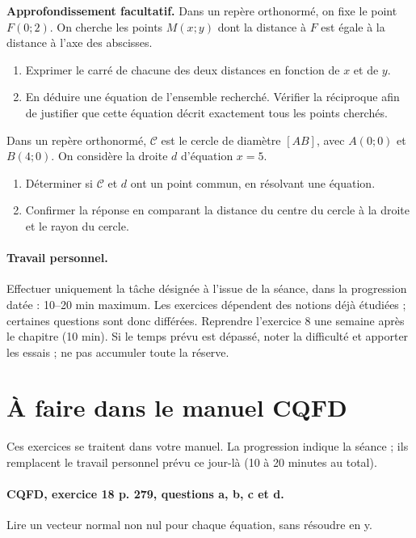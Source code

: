 \textbf{Approfondissement facultatif.} Dans un repère orthonormé, on fixe le point $F(0;2)$. On cherche les points $M(x;y)$ dont la distance à $F$ est égale à la distance à l’axe des abscisses.
\begin{enumerate}[label=\arabic*.]
\item Exprimer le carré de chacune des deux distances en fonction de $x$ et de $y$.
\item En déduire une équation de l’ensemble recherché. Vérifier la réciproque afin de justifier que cette équation décrit exactement tous les points cherchés.
\end{enumerate}
Dans un repère orthonormé, $\mathcal C$ est le cercle de diamètre $[AB]$, avec $A(0;0)$ et $B(4;0)$. On considère la droite $d$ d’équation $x=5$.
\begin{enumerate}[label=\arabic*.]
\item Déterminer si $\mathcal C$ et $d$ ont un point commun, en résolvant une équation.
\item Confirmer la réponse en comparant la distance du centre du cercle à la droite et le rayon du cercle.
\end{enumerate}
\paragraph{Travail personnel.} Effectuer uniquement la tâche désignée à l’issue de la séance, dans la progression datée : 10–20 min maximum. Les exercices dépendent des notions déjà étudiées ; certaines questions sont donc différées. Reprendre l’exercice 8 une semaine après le chapitre (10 min). Si le temps prévu est dépassé, noter la difficulté et apporter les essais ; ne pas accumuler toute la réserve.
\endgroup
{}\section*{À faire dans le manuel CQFD}
Ces exercices se traitent dans votre manuel. La progression indique la séance ; ils remplacent le travail personnel prévu ce jour-là (10 à 20 minutes au total).
\paragraph{CQFD, exercice 18 p. 279, questions a, b, c et d.}\label{C07-M1} Lire un vecteur normal non nul pour chaque équation, sans résoudre en y.
